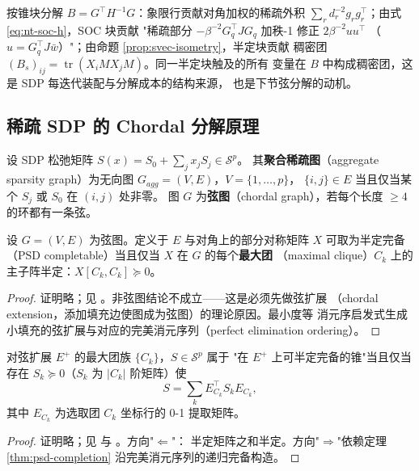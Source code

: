 按锥块分解 $B = G^\top H^{-1} G$：象限行贡献对角加权的稀疏外积
$\sum_r d_r^{-2} g_r g_r^\top$；由式 \eqref{eq:nt-soc-h}，SOC 块贡献
"稀疏部分 $-\beta^{-2} G_q^\top J G_q$ 加秩-1 修正 $2\beta^{-2} uu^\top$
（$u = G_q^\top J\bar w$）"；由命题 \ref{prop:svec-isometry}，半定块贡献
稠密团 $(B_s)_{ij} = \operatorname{tr}(X_i M X_j M)$。同一半定块触及的所有
变量在 $B$ 中构成稠密团，这是 SDP 每迭代装配与分解成本的结构来源，
也是下节弦分解的动机。

\subsection{稀疏 SDP 的 Chordal 分解原理}

\begin{definition}[聚合稀疏图]
设 SDP 松弛矩阵 $S(x) = S_0 + \sum_j x_j S_j \in \mathcal{S}^p$。
其\textbf{聚合稀疏图}（aggregate sparsity graph）为无向图
$G_{agg} = (V, E)$，$V = \{1,\ldots,p\}$，
$\{i,j\} \in E$ 当且仅当某个 $S_j$ 或 $S_0$ 在 $(i,j)$ 处非零。
图 $G$ 为\textbf{弦图}（chordal graph），若每个长度 $\ge 4$ 的环都有一条弦。
\end{definition}

\begin{theorem}
\label{thm:psd-completion}
设 $G = (V, E)$ 为弦图。定义于 $E$ 与对角上的部分对称矩阵 $X$
可取为半定完备（PSD completable）当且仅当 $X$ 在 $G$ 的每个\textbf{最大团}
（maximal clique）$C_k$ 上的主子阵半定：$X[C_k, C_k] \succeq 0$。
\end{theorem}
\begin{proof}
证明略；见 \cite{grone1984}。非弦图结论不成立——这是必须先做弦扩展
（chordal extension，添加填充边使图成为弦图）的理论原因。最小度等
消元序启发式生成小填充的弦扩展与对应的完美消元序列（perfect
elimination ordering）。
\end{proof}

\begin{theorem}
\label{thm:agler}
对弦扩展 $E^+$ 的最大团族 $\{C_k\}$，$S \in \mathcal{S}^p$ 属于
"在 $E^+$ 上可半定完备的锥"当且仅当存在 $S_k \succeq 0$（$S_k$ 为
$|C_k|$ 阶矩阵）使
\begin{equation}
\label{eq:agler}
S = \sum_k E_{C_k}^\top S_k E_{C_k},
\end{equation}
其中 $E_{C_k}$ 为选取团 $C_k$ 坐标行的 0-1 提取矩阵。
\end{theorem}
\begin{proof}
证明略；见 \cite{agler1988} 与 \cite{fukuda2001}。方向"$\Leftarrow$"：
半定矩阵之和半定。方向"$\Rightarrow$"依赖定理 \ref{thm:psd-completion}
沿完美消元序列的递归完备构造。
\end{proof}

